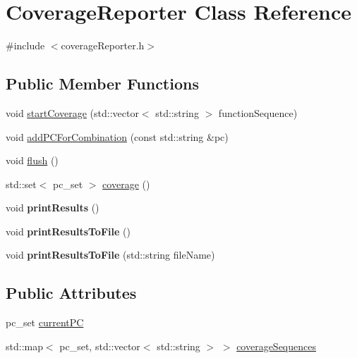 \hypertarget{classCoverageReporter}{}\section{Coverage\+Reporter Class Reference}
\label{classCoverageReporter}


{\ttfamily \#include $<$coverage\+Reporter.\+h$>$}

\subsection*{Public Member Functions}
\begin{DoxyCompactItemize}
\item 
void \hyperlink{classCoverageReporter_a560eff3e34be25d1a49c37ffd99e69c1}{start\+Coverage} (std\+::vector$<$ std\+::string $>$ function\+Sequence)
\item 
void \hyperlink{classCoverageReporter_a477866b25aa53c3ebbc60de7b7863943}{add\+P\+C\+For\+Combination} (const std\+::string \&pc)
\item 
void \hyperlink{classCoverageReporter_a046428d09487a4a3d3420caf77f436df}{flush} ()
\item 
std\+::set$<$ pc\+\_\+set $>$ \hyperlink{classCoverageReporter_af515596c46758142ea7aa7dbbab47b7e}{coverage} ()
\item 
\mbox{\label{classCoverageReporter_a4c9c89e13cc4bc7f5cb26441c1e7e723}} 
void {\bfseries print\+Results} ()
\item 
\mbox{\label{classCoverageReporter_aadef25c261ffd89e68fe9e59da591247}} 
void {\bfseries print\+Results\+To\+File} ()
\item 
\mbox{\label{classCoverageReporter_aa195d96544ab9b29a6a6f7fbcb11070a}} 
void {\bfseries print\+Results\+To\+File} (std\+::string file\+Name)
\end{DoxyCompactItemize}
\subsection*{Public Attributes}
\begin{DoxyCompactItemize}
\item 
pc\+\_\+set \hyperlink{classCoverageReporter_a731717e0ad503323a0b541b8c1497080}{current\+PC}
\item 
std\+::map$<$ pc\+\_\+set, std\+::vector$<$ std\+::string $>$ $>$ \hyperlink{classCoverageReporter_a395e6d59cc394e670fff1e8a575fc329}{coverage\+Sequences}
\end{DoxyCompactItemize}


